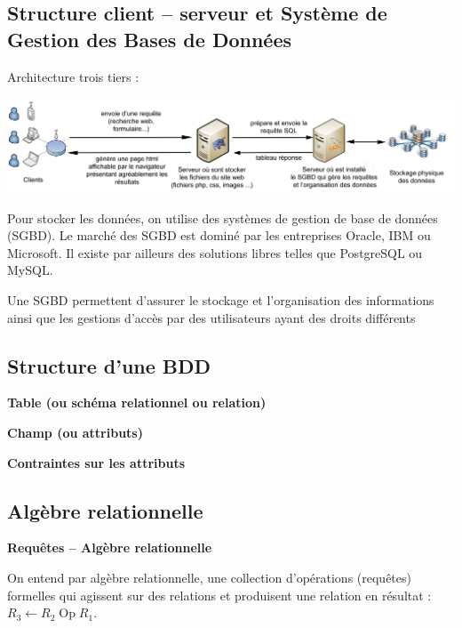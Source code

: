 \documentclass[10pt,fleqn]{article} %
\begin{document}

\vspace{2cm}
\pagestyle{fancy}
\thispagestyle{plain}


\subsection*{Structure client -- serveur et Système de Gestion des Bases de Données}

Architecture trois tiers : 
\begin{center}
\includegraphics[width=.9\textwidth]{images/bdd}
\end{center}
Pour stocker les données, on utilise des systèmes de gestion de base de données (SGBD). Le marché des SGBD est dominé par les entreprises Oracle, IBM ou Microsoft. Il existe par ailleurs des solutions libres telles que PostgreSQL ou MySQL. 

Une SGBD permettent d'assurer le stockage et l'organisation des informations ainsi que les gestions d'accès par des utilisateurs ayant des droits différents

\subsection*{Structure d'une BDD}
\begin{defi}
\textbf{Table (ou schéma relationnel ou relation)}

\textbf{Champ (ou attributs)}

\textbf{Contraintes sur les attributs}
\end{defi}


\subsection*{Algèbre relationnelle}


\begin{defi}
\textbf{Requêtes -- Algèbre relationnelle}

On entend par algèbre relationnelle, une collection d'opérations (requêtes) formelles qui agissent sur des relations et produisent une relation en résultat : $R_3 \leftarrow R_2 \;  \text{Op} \;  R_1$.
\end{defi}
\end{document}
